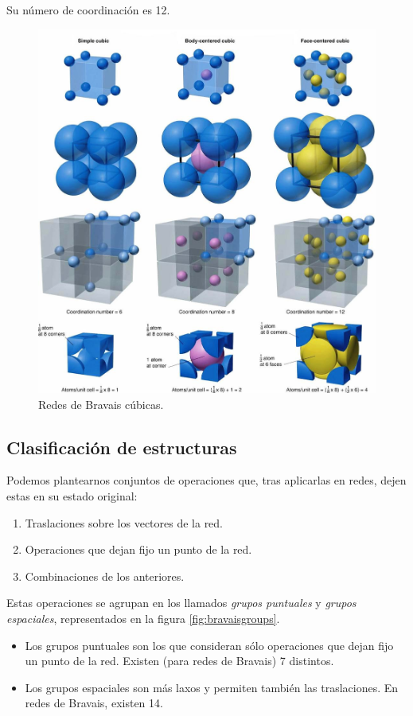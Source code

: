 Su número de coordinación es 12.
\begin{figure}
  \centering
  \includegraphics[width=\textwidth]{figures/cubes.png}
  \caption{Redes de Bravais cúbicas.}
  \label{fig:cubes}
\end{figure}


\subsection{Clasificación de estructuras}
Podemos plantearnos conjuntos de operaciones que, tras aplicarlas en
redes, dejen estas en su estado original:
\begin{enumerate}
\item Traslaciones sobre los vectores de la red.
\item Operaciones que dejan fijo un punto de la red.
\item Combinaciones de los anteriores.
\end{enumerate}

Estas operaciones se agrupan en los llamados \emph{grupos
  puntuales} y \emph{grupos espaciales}, representados en la figura \ref{fig:bravaisgroups}.
\begin{itemize}
\item Los grupos puntuales son los que consideran sólo operaciones que dejan
fijo un punto de la red. Existen (para redes de Bravais) 7 distintos.
\item Los grupos espaciales son más laxos y permiten también las
traslaciones. En redes de Bravais, existen 14.
\end{itemize}


